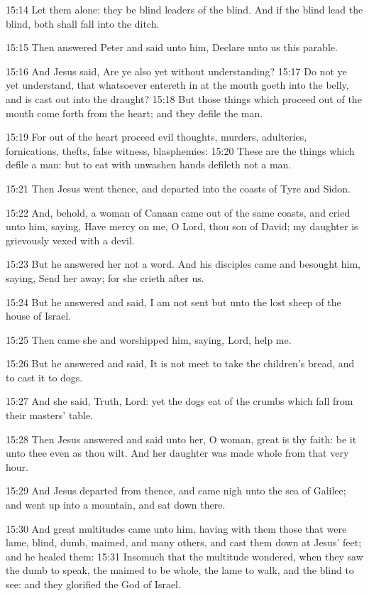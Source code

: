 15:14 Let them alone: they be blind leaders of the blind. And if the blind lead the blind, both shall fall into the ditch.

15:15 Then answered Peter and said unto him, Declare unto us this parable.

15:16 And Jesus said, Are ye also yet without understanding?  15:17 Do not ye yet understand, that whatsoever entereth in at the mouth goeth into the belly, and is cast out into the draught?  15:18 But those things which proceed out of the mouth come forth from the heart; and they defile the man.

15:19 For out of the heart proceed evil thoughts, murders, adulteries, fornications, thefts, false witness, blasphemies: 15:20 These are the things which defile a man: but to eat with unwashen hands defileth not a man.

15:21 Then Jesus went thence, and departed into the coasts of Tyre and Sidon.

15:22 And, behold, a woman of Canaan came out of the same coasts, and cried unto him, saying, Have mercy on me, O Lord, thou son of David; my daughter is grievously vexed with a devil.

15:23 But he answered her not a word. And his disciples came and besought him, saying, Send her away; for she crieth after us.

15:24 But he answered and said, I am not sent but unto the lost sheep of the house of Israel.

15:25 Then came she and worshipped him, saying, Lord, help me.

15:26 But he answered and said, It is not meet to take the children's bread, and to cast it to dogs.

15:27 And she said, Truth, Lord: yet the dogs eat of the crumbs which fall from their masters' table.

15:28 Then Jesus answered and said unto her, O woman, great is thy faith: be it unto thee even as thou wilt. And her daughter was made whole from that very hour.

15:29 And Jesus departed from thence, and came nigh unto the sea of Galilee; and went up into a mountain, and sat down there.

15:30 And great multitudes came unto him, having with them those that were lame, blind, dumb, maimed, and many others, and cast them down at Jesus' feet; and he healed them: 15:31 Insomuch that the multitude wondered, when they saw the dumb to speak, the maimed to be whole, the lame to walk, and the blind to see: and they glorified the God of Israel.


